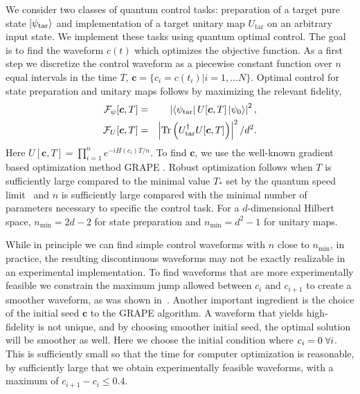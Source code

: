 \documentclass[aps,prl,onecolumn,reprint,superscriptaddress]{revtex4}
\begin{document}
We consider two classes of quantum control tasks: preparation of a target pure state $\ket{\psi_\text{tar}}$ and implementation of a target unitary map $U_\text{tar}$ on an arbitrary input state.  We implement these tasks using quantum optimal control. The goal is to find the waveform $c(t)$ which optimizes the objective function.  As a first step we discretize the control waveform as a piecewise constant function over $n$ equal intervals in the time $T$, $\mathbf{c}=\{c_i = c(t_i) | i=1,\dots N\}$.  Optimal control for state preparation and unitary maps follows by maximizing the relevant fidelity, 
\begin{eqnarray}
\mathcal{F}_{\psi}[\bm{c},T]&=&\left|\bra{\psi_{\text{tar}}}U[\bm{c},T]\ket{\psi_0}\right|^2,\\
\mathcal{F}_U[\bm{c},T]&=&\left|\Tr\left(U^{\dagger}_{\text{tar}}U[\bm{c},T]\right)\right|^2/d^2.
\label{eq:fidelity}
\end{eqnarray} 
Here $U[\bm{c},T] =\prod_{i=1}^n e^{-iH(c_i)T/n}$.  To find $\mathbf{c}$, we use the well-known gradient based optimization method GRAPE \cite{khaneja2005optimal}. Robust optimization follows when $T$ is sufficiently large compared to the minimal value $T_*$ set by the quantum speed limit~\cite{caneva2009optimal} and $n$ is sufficiently large compared with the minimal number of parameters necessary to specific the control task.  For a $d$-dimensional Hilbert space, $n_{\min} = 2d-2$ for state preparation and $n_{\min} =d^2-1$ for unitary maps.

 
While in principle we can find simple control waveforms with $n$ close to $n_{\min}$, in practice, the resulting discontinuous waveforms may not be exactly realizable in an experimental implementation. To find waveforms that are more experimentally feasible we constrain the maximum jump allowed between $c_i \text{ and } c_{i+1}$ to create a smoother waveform, as was shown in~\cite{Frey2020}.  Another important ingredient is the choice of the initial seed $\mathbf{c}$ to the GRAPE algorithm. A waveform that yields high-fidelity is not unique, and by choosing smoother initial seed, the optimal solution will be smoother as well.    Here we choose the initial condition where $c_i=0 \hspace{0.1cm}\forall i$.  This is sufficiently small so that the time for computer optimization is reasonable, by sufficiently large that we obtain experimentally feasible waveforms, with a maximum of  $c_{i+1}-c_i \leq 0.4 $.  
\end{document}
